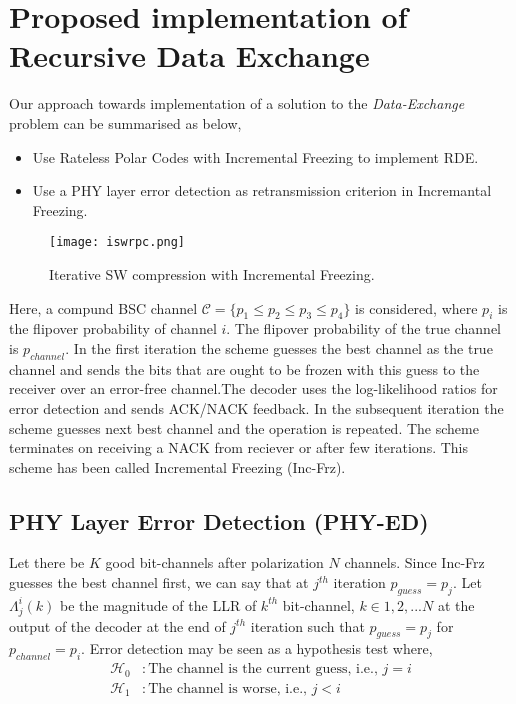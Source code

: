 \documentclass[
11pt, %
a4paper, %
oneside, %
headinclude,footinclude, %
BCOR5mm, %
]{scrartcl}
\begin{document}
\section*{Proposed implementation of Recursive Data Exchange} \label{propsol}
Our approach towards implementation of a solution to the \emph{Data-Exchange} problem can be summarised as below, 
\begin{itemize}
\item{Use Rateless Polar Codes with Incremental Freezing to implement RDE.}
\item{Use a PHY layer error detection as retransmission criterion in Incremantal Freezing.}
\end{itemize}
\begin{figure}[h]
 \begin{center}
    \texttt{[image: iswrpc.png]}
  \end{center}
  \caption{Iterative SW compression with Incremental Freezing.}
  \label{fig:iswrpc}
\end{figure} 
Here, a compund BSC channel $\mathcal{C}=\{ p_1 \leq p_2 \leq p_3 \leq p_4\}$ is considered, where $p_i$ is the flipover probability of channel $i$. The flipover probability of the true channel is $p_{channel}$.
In the first iteration the scheme guesses the best channel as the true channel and sends the bits that are ought to be frozen with this guess to the receiver over an error-free channel.The decoder uses the log-likelihood ratios for error detection and sends ACK/NACK feedback. In the subsequent iteration the scheme guesses next best channel and the operation is repeated. The scheme terminates on receiving a NACK from reciever or after few iterations. This scheme has been called Incremental Freezing (Inc-Frz).



\subsection*{PHY Layer Error Detection (PHY-ED)} 
Let there be $K$ good bit-channels after polarization $N$ channels.  
Since Inc-Frz guesses the best channel first, we can say that at $j^{th}$ iteration $p_{guess}=p_j$. 
Let $\Lambda_j^i(k)$ be the magnitude of the LLR of $k^{th}$ bit-channel, $k\in{1,2,...N}$ at the output of the decoder at the end of $j^{th}$ iteration such that $p_{guess}=p_j$ for $p_{channel}=p_i$. 
Error detection may be seen as a hypothesis test where,
\begin{align*}
\mathcal{H}_0 & :\text{The channel is the current guess, i.e., } j=i\\
\mathcal{H}_1 & :\text{The channel is worse, i.e., }j<i
\end{align*}
\end{document}

